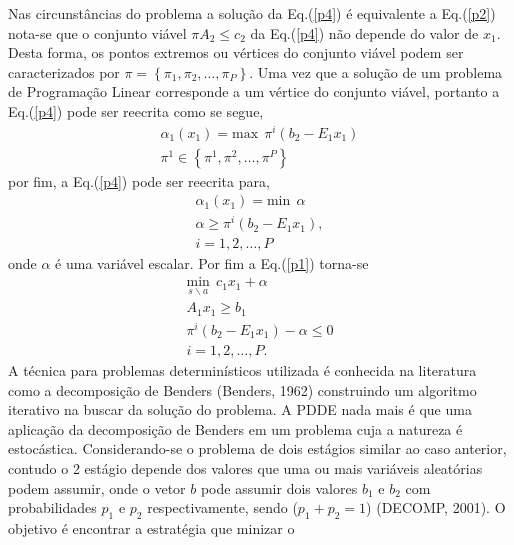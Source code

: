 \documentclass[12pt,fleqn]{article}
\begin{document}
Nas circunst\^ancias do problema a solu\c c\~ao da Eq.(\ref{p4}) \'e equivalente a Eq.(\ref{p2})
nota-se que o conjunto vi\'avel $\pi A_2 \leq c_2$ da Eq.(\ref{p4}) n\~ao depende do valor de $x_1$. Desta forma, os
pontos extremos ou v\'ertices do conjunto vi\'avel podem ser caracterizados por $\pi = \left\{ \pi_1, \pi_2, \dots,
\pi_P \right\}$. Uma vez
que a solu\c c\~ao de um problema de Programa\c c\~ao Linear corresponde  a um v\'ertice do conjunto vi\'avel,
portanto a Eq.(\ref{p4}) pode ser reecrita como se segue,
\begin{equation*}
  \begin{aligned}
	{\alpha}_{1}(x_1) = \text {max} \ \ {\pi}^{i} (b_2 - E_1x_1) \\
	{\pi}^{1} \in \left\{ {\pi}^{1}, {\pi}^{2},\dots, {\pi}^{P} \right\}
  \end{aligned}
	\label{p5}
\end{equation*}
por fim, a Eq.(\ref{p4}) pode ser reecrita para, 
\begin{equation}
  \begin{aligned}
	{\alpha}_{1}(x_1) = \text {min} \ \ \alpha \\ 
	\alpha \geq {\pi}^{i}(b_2 - E_1 x_1), 
	\\ i = 1,2, \dots , P
  \end{aligned}
	\label{p6}
\end{equation}
onde $\alpha$ \'e uma vari\'avel escalar. Por fim a Eq.(\ref{p1}) torna-se 
\begin{equation}
  \begin{aligned}
	\underset {s \backslash a} { \text {min}} \ \ c_1x_1 + \alpha \\
	A_1 x_1 \geq b_1 \\
	{\pi}^{i}(b_2 - E_1x_1) - \alpha \leq 0 \\ 
	i = 1, 2, \dots , P.
  \end{aligned}
	\label{p7}
\end{equation}
A t\'ecnica para problemas determin\'isticos utilizada \'e conhecida na literatura como a decomposi\c c\~ao de Benders
(Benders, 1962)
construindo um algoritmo iterativo na buscar da solu\c c\~ao do problema. A PDDE nada
mais \'e que uma aplica\c c\~ao da decomposi\c c\~ao de Benders em um problema cuja a
natureza \'e
 estoc\'astica. Considerando-se o problema de dois est\'agios similar ao caso anterior, contudo o 2 est\'agio depende dos valores
que uma ou mais vari\'aveis aleat\'orias podem assumir, onde o vetor $b$ pode assumir dois valores $b_1$ e $b_2$ com
probabilidades $p_1$ e $p_2$ respectivamente, sendo ($p_1 + p_2 = 1$) (DECOMP, 2001). O objetivo \'e encontrar a estrat\'egia que minizar o
\end{document}
